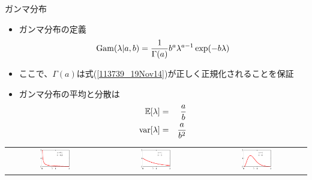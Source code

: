\begin{frame}{ガンマ分布}
 \begin{itemize}
  \item ガンマ分布の定義
        \begin{equation}
         {\rm Gam}(\lambda|a,b) = \frac{1}{\Gamma(a)}b^a\lambda^{a-1}\exp(-b\lambda)\label{113739_19Nov14}
        \end{equation}
  \item ここで、$\Gamma(a)$は式(\ref{113739_19Nov14})が正しく正規化されることを保証
  \item ガンマ分布の平均と分散は
        \begin{eqnarray}
         \mathbb{E}[\lambda] &=& \frac{a}{b}\\
         {\rm var}[\lambda]& =& \frac{a}{b^2}
        \end{eqnarray}
 \end{itemize}
 \begin{tabular}[tb]{ccc}
  \includegraphics[width=0.33\textwidth]{./figure/Figure2.13a.eps}
  &
  \includegraphics[width=0.33\textwidth]{./figure/Figure2.13b.eps}
  &
  \includegraphics[width=0.33\textwidth]{./figure/Figure2.13c.eps}
 \end{tabular}
\end{frame}

